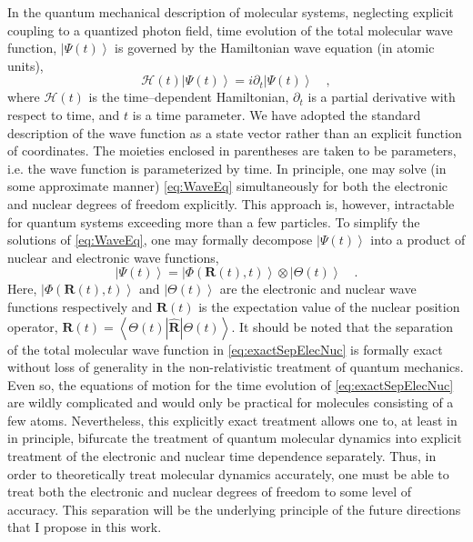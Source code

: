 \documentclass[12pt]{article}
\newcommand{\ket}[1]{\left\vert #1 \right\rangle}         %
\newcommand{\innerop}[3]{\left\langle #1 \left\vert #2 \right\vert #3 \right\rangle}  %
\newcommand*\vc[1]{\boldsymbol{#1}}
\newcommand*\op[1]{\mathcal{#1}}
\begin{document}
In the quantum mechanical description of molecular systems, neglecting explicit
coupling to a quantized photon field, time evolution of the total molecular wave
function, $\ket{\Psi (t)}$ is governed by the Hamiltonian wave equation 
(in atomic units),
\begin{equation}
\op{H}(t) \ket{\Psi (t)} = i\partial_t \ket{\Psi(t)} \quad,
\label{eq:WaveEq}
\end{equation}
where $\op{H}(t)$ is the time--dependent Hamiltonian, $\partial_t$ is a
partial derivative with respect to time, and $t$ is a time parameter. We have
adopted the standard description of the wave function as a state vector rather
than an explicit function of coordinates. The moieties enclosed in parentheses
are taken to be parameters, i.e. the wave function is parameterized by time.  In
principle, one may solve (in some approximate manner) \cref{eq:WaveEq}
simultaneously for both the electronic and nuclear degrees of freedom
explicitly. This approach is, however, intractable for quantum systems exceeding
more than a few particles. To simplify the solutions of \cref{eq:WaveEq}, one
may formally decompose $\ket{\Psi (t)}$ into a product of nuclear and electronic
wave functions,
\begin{equation} 
\ket{\Psi (t)} = \ket{\Phi(\vc{R}(t),t)}\otimes\ket{\Theta(t)} 
\quad .  
\label{eq:exactSepElecNuc}
\end{equation} 
Here, $\ket{\Phi(\vc{R}(t),t)}$ and $\ket{\Theta (t)}$ are the electronic and
nuclear wave functions respectively and $\vc{R}(t)$ is the expectation value of
the nuclear position operator, $\vc{R}(t) =
\innerop{\Theta(t)}{\hat{\vc{R}}}{\Theta(t)}$.  It should be noted that the
separation of the total molecular wave function in \cref{eq:exactSepElecNuc} is
formally exact\cite{Gross10_PRL123002, Cederbaum08_JCP124101} without loss of
generality in the non-relativistic treatment of quantum mechanics. Even so, the
equations of motion for the time evolution of \cref{eq:exactSepElecNuc} are
wildly complicated\cite{Ghosh15_MP1} and would only be practical for molecules
consisting of a few atoms.  Nevertheless, this explicitly exact treatment allows
one to, at least in in principle, bifurcate the treatment of quantum molecular
dynamics into explicit treatment of the electronic and nuclear time dependence
separately.  Thus, in order to theoretically treat molecular dynamics
accurately, one must be able to treat both the electronic and nuclear degrees of
freedom to some level of accuracy.  This separation will be the underlying
principle of the future directions that I propose in this work.
\end{document}
